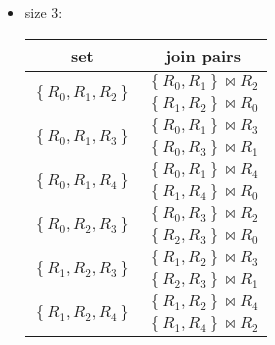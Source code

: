 \documentclass[12pt]{scrartcl}
\begin{document}
\begin{enumerate}
\begin{itemize}
		\item size 3:
			\begin{table}[H]
			\begin{center}
				\begin{tabular}{cc}
					\hline
					set & join pairs \\ \hline 
					\multirow{2}{*}{$\left\lbrace R_{0}, R_{1}, R_{2}\right\rbrace$}	& $\left\lbrace R_{0}, R_{1}\right\rbrace \bowtie R_{2}$ \\
																						& $\left\lbrace R_{1}, R_{2}\right\rbrace \bowtie R_{0}$ \\ \hline
					\multirow{2}{*}{$\left\lbrace R_{0}, R_{1}, R_{3}\right\rbrace$}	& $\left\lbrace R_{0}, R_{1}\right\rbrace \bowtie R_{3}$ \\
					& $\left\lbrace R_{0}, R_{3}\right\rbrace \bowtie R_{1}$ \\ \hline
					\multirow{2}{*}{$\left\lbrace R_{0}, R_{1}, R_{4}\right\rbrace$}	& $\left\lbrace R_{0}, R_{1}\right\rbrace \bowtie R_{4}$\\
																						& $\left\lbrace R_{1}, R_{4}\right\rbrace \bowtie R_{0}$\\ \hline
					\multirow{2}{*}{$\left\lbrace R_{0}, R_{2}, R_{3}\right\rbrace$}	& $\left\lbrace R_{0}, R_{3}\right\rbrace \bowtie R_{2}$\\
																						& $\left\lbrace R_{2}, R_{3}\right\rbrace \bowtie R_{0}$\\ \hline
					\multirow{2}{*}{$\left\lbrace R_{1}, R_{2}, R_{3}\right\rbrace$}	& $\left\lbrace R_{1}, R_{2}\right\rbrace \bowtie R_{3} $\\
																						& $\left\lbrace R_{2}, R_{3}\right\rbrace \bowtie R_{1} $\\ \hline
					
					\multirow{2}{*}{$\left\lbrace R_{1}, R_{2}, R_{4}\right\rbrace$}	& $\left\lbrace R_{1}, R_{2}\right\rbrace \bowtie R_{4}$ \\
																						& $\left\lbrace R_{1}, R_{4}\right\rbrace \bowtie R_{2}$ \\ \hline											
				\end{tabular}
			\end{center}
		\end{table}
		

\end{itemize}
\end{enumerate}
\end{document}
